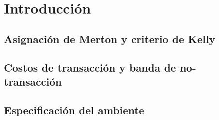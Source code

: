 \section{Introducción}
\label{sec:introduccion}


\subsection{Asignación de Merton y criterio de Kelly}
\label{sec:merton}


\subsection{Costos de transacción y banda de no-transacción}
\label{sec:banda}


\subsection{Especificación del ambiente}
\label{sec:ambiente}

